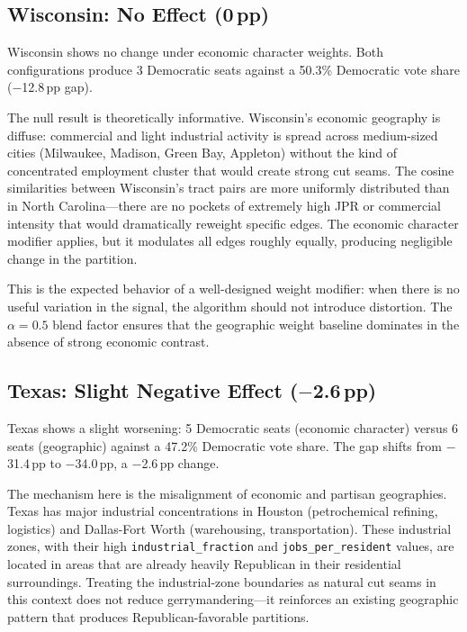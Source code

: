 \subsection{Wisconsin: No Effect (0\,pp)}

Wisconsin shows no change under economic character weights.
Both configurations produce 3 Democratic seats against a 50.3\% Democratic
vote share ($-$12.8\,pp gap).

The null result is theoretically informative.
Wisconsin's economic geography is diffuse: commercial and light industrial
activity is spread across medium-sized cities (Milwaukee, Madison, Green Bay,
Appleton) without the kind of concentrated employment cluster that would
create strong cut seams.
The cosine similarities between Wisconsin's tract pairs are more uniformly
distributed than in North Carolina---there are no pockets of extremely high
JPR or commercial intensity that would dramatically reweight specific edges.
The economic character modifier applies, but it modulates all edges roughly
equally, producing negligible change in the partition.

This is the expected behavior of a well-designed weight modifier: when there
is no useful variation in the signal, the algorithm should not introduce
distortion.
The $\alpha = 0.5$ blend factor ensures that the geographic weight baseline
dominates in the absence of strong economic contrast.

\subsection{Texas: Slight Negative Effect ($-$2.6\,pp)}

Texas shows a slight worsening: 5 Democratic seats (economic character) versus
6 seats (geographic) against a 47.2\% Democratic vote share.
The gap shifts from $-$31.4\,pp to $-$34.0\,pp, a $-$2.6\,pp change.

The mechanism here is the misalignment of economic and partisan geographies.
Texas has major industrial concentrations in Houston (petrochemical refining,
logistics) and Dallas-Fort Worth (warehousing, transportation).
These industrial zones, with their high \texttt{industrial\_fraction} and
\texttt{jobs\_per\_resident} values, are located in areas that are already
heavily Republican in their residential surroundings.
Treating the industrial-zone boundaries as natural cut seams in this context
does not reduce gerrymandering---it reinforces an existing geographic pattern
that produces Republican-favorable partitions.


